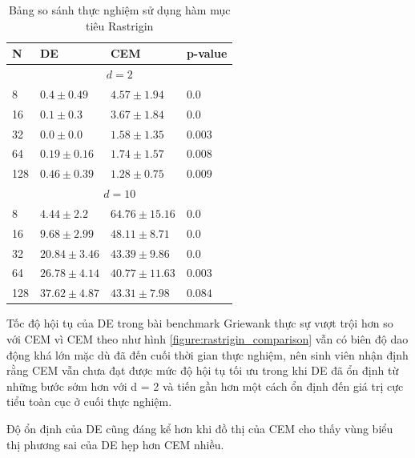 \documentclass[10pt]{report}
\begin{document}
\begin{table}[H]\centering
	\caption{Bảng so sánh thực nghiệm sử dụng hàm mục tiêu Rastrigin}
	\begin{tabularx}{0.8\textwidth}{p{5em}XXl}
		\toprule
		\textbf{N} & \textbf{DE}                 & \textbf{CEM}        & \textbf{p-value}   \\
		\midrule
		\multicolumn{4}{c}{\(d = 2\)}                                                       \\
		\midrule
		8          & \(\mathbf{0.4 \pm 0.49}\)   & \(4.57 \pm 1.94\)   & \(\mathbf{0.0}\)   \\
		16         & \(\mathbf{0.1 \pm 0.3}\)    & \(3.67 \pm 1.84\)   & \(\mathbf{0.0}\)   \\
		32         & \(\mathbf{0.0 \pm 0.0}\)    & \(1.58 \pm 1.35\)   & \(\mathbf{0.003}\) \\
		64         & \(\mathbf{0.19 \pm 0.16}\)  & \(1.74 \pm 1.57\)   & \(\mathbf{0.008}\) \\
		128        & \(\mathbf{0.46 \pm 0.39}\)  & \(1.28 \pm 0.75\)   & \(\mathbf{0.009}\) \\
		\midrule
		\multicolumn{4}{c}{\(d = 10\)}                                                      \\
		\midrule
		8          & \(\mathbf{4.44 \pm 2.2}\)   & \(64.76 \pm 15.16\) & \(\mathbf{0.0}\)   \\
		16         & \(\mathbf{9.68 \pm 2.99}\)  & \(48.11 \pm 8.71\)  & \(\mathbf{0.0}\)   \\
		32         & \(\mathbf{20.84 \pm 3.46}\) & \(43.39 \pm 9.86\)  & \(\mathbf{0.0}\)   \\
		64         & \(\mathbf{26.78 \pm 4.14}\) & \(40.77 \pm 11.63\) & \(\mathbf{0.003}\) \\
		128        & \(\mathbf{37.62 \pm 4.87}\) & \(43.31 \pm 7.98\)  & \(0.084\)          \\
		\bottomrule
	\end{tabularx}
\end{table}

Tốc độ hội tụ của DE trong bài benchmark Griewank thực sự vượt trội hơn so với CEM vì CEM theo như hình \ref{figure:rastrigin_comparison} vẫn có biên độ dao động khá lớn mặc dù đã đến cuối thời gian thực nghiệm, nên sinh viên nhận định rằng CEM vẫn chưa đạt được mức độ hội tụ tối ưu trong khi DE đã ổn định từ những bước sớm hơn với d = 2 và tiến gần hơn một cách ổn định đến giá trị cực tiểu toàn cục ở cuối thực nghiệm.

Độ ổn định của DE cũng đáng kể hơn khi đồ thị của CEM cho thấy vùng biểu thị phương sai của DE hẹp hơn CEM nhiều.
\end{document}
